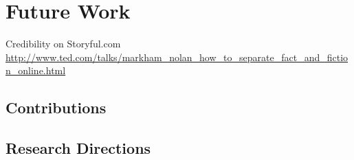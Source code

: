 

\chapter{Future Work}

\ifpdf
    \graphicspath{{9_future_work/figures/PNG/}{9_future_work/figures/PDF/}{9_future_work/figures/}}
\else
    \graphicspath{{9_future_work/figures/EPS/}{9_future_work/figures/}}
\fi


Credibility on Storyful.com \url{http://www.ted.com/talks/markham_nolan_how_to_separate_fact_and_fiction_online.html}

\section{Contributions}

\section{Research Directions}





